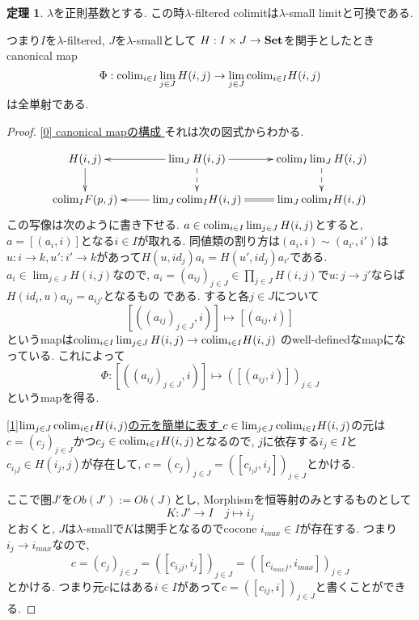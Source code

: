 \documentclass[dvipdfmx,a4paper,11pt]{report}
\newcommand{\colim}{{\rm colim}}
\theoremstyle{definition}
\newtheorem{thm}{定理}
\begin{document}
 \begin{tcolorbox}
 [colback = white, colframe = green!35!black, fonttitle = \bfseries,breakable = true]
\begin{thm}
\label{thm-regular-commute}
$\lambda$を正則基数とする. 
この時$\lambda$-filtered colimitは$\lambda$-small limitと可換である.

つまり$I$を$\lambda$-filtered, $J$を$\lambda$-smallとして
$H : I \times J \to {\bf Set}$を関手としたとき
canonical map
$$
\Phi: \colim_{i \in I} \lim_{j \in J}H(i,j)
\to
\lim_{j \in J}
\colim_{i \in I} H(i,j)
$$
は全単射である. 
\end{thm}
 \end{tcolorbox}

\begin{proof}

\underline{[0] canonical mapの構成 }
それは次の図式からわかる. 

\begin{equation*}
\xymatrix@C=25pt@R=20pt{
H(i,j)\ar@{->}[d]
& \lim_{J} H(i,j)\ar@{-->}[d]\ar@{->}[l]\ar@{->}[r]
&\colim_{I}\lim_{J} H(i,j)\ar@{-->}[d]
\\
\colim_{I}F(p,j)
&\lim_{J}\colim_{I}H(i,j)\ar@{->}[l]
&\lim_{J}\colim_{I}H(i,j)\ar@{=}[l] \\   
}
\end{equation*}
この写像は次のように書き下せる.
$a \in \colim_{i \in I} \lim_{j \in J}H(i,j)$とすると, $a = [(a_i, i)]$となる$i \in I$が取れる.
同値類の割り方は$(a_i, i) \sim (a_{i'}, i')$は$u : i \to k, u' : i' \to k$があって$H(u, id_{j})a_i = H(u', id_{j})a_{i'}$である.
$a_i \in \lim_{j \in J}H(i,j)$なので, 
$a_i =(a_{ij})_{j \in J} \in \prod_{j \in J}H(i,j)$で$u : j \to j'$ならば$H(id_{i}, u)a_{ij} = a_{ij'}$となるもの
である.
すると各$j \in J$について
$$
[((a_{ij})_{j \in J} , i)] \mapsto [(a_{ij}, i)]
$$
というmapは$\colim_{i \in I} \lim_{j \in J}H(i,j) \to \colim_{i \in I} H(i,j)$
のwell-definedなmapになっている. これによって
$$
\Phi : [((a_{ij})_{j \in J} , i)] \mapsto ([(a_{ij}, i)])_{j \in J}
$$
というmapを得る. 

\underline{[1]$\lim_{j \in J}\colim_{i \in I} H(i,j)$の元を簡単に表す } 
$c \in \lim_{j \in J}\colim_{i \in I} H(i,j)$の元は
$c = (c_j)_{j \in J}$かつ$c_j \in \colim_{i \in I} H(i,j)$となるので, 
$j$に依存する$i_{j} \in I$と$c_{i_{j}j} \in H(i_{j},j)$が存在して, 
$c = (c_j)_{j \in J}=([c_{i_{j}j}, i_{j}])_{j \in J}$とかける. 

ここで圏$J'$を$Ob(J'):=Ob(J)$とし, Morphismを恒等射のみとするものとして
$$
K : J' \to I \quad j \mapsto i_{j}
$$
とおくと, $J$は$\lambda$-smallで$K$は関手となるのでcocone $i_{max} \in I$が存在する.
つまり$i_j \to i_{max}$なので,
 $$
 c = (c_j)_{j \in J}=([c_{i_{j}j}, i_{j}])_{j \in J}
 =([c_{i_{max}j}, i_{max}])_{j \in J}
 $$
 とかける. 
 つまり元$c$にはある$i \in I$があって$c= ([c_{ij}, i])_{j \in J}$と書くことができる. 
 


\end{proof}
\end{document}
